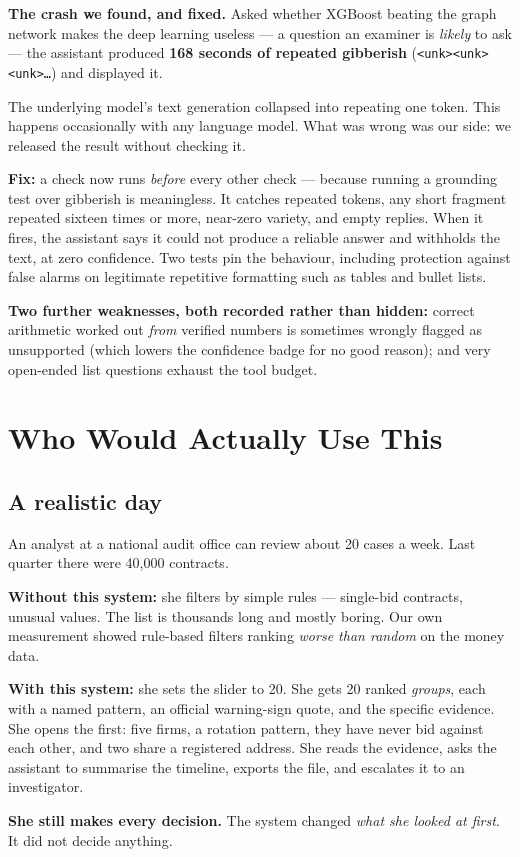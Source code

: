 \documentclass[11pt,a4paper]{article}
\newcommand{\code}[1]{\texttt{\small #1}}
\begin{document}
\begin{warnbox}
\textbf{The crash we found, and fixed.} Asked whether XGBoost beating the graph
network makes the deep learning useless --- a question an examiner is
\emph{likely} to ask --- the assistant produced \textbf{168 seconds of repeated
gibberish} (\code{<unk><unk><unk>\ldots}) and displayed it.

The underlying model's text generation collapsed into repeating one token. This
happens occasionally with any language model. What was wrong was our side: we
released the result without checking it.

\textbf{Fix:} a check now runs \emph{before} every other check --- because
running a grounding test over gibberish is meaningless. It catches repeated
tokens, any short fragment repeated sixteen times or more, near-zero variety,
and empty replies. When it fires, the assistant says it could not produce a
reliable answer and withholds the text, at zero confidence. Two tests pin the
behaviour, including protection against false alarms on legitimate repetitive
formatting such as tables and bullet lists.
\end{warnbox}

\textbf{Two further weaknesses, both recorded rather than hidden:} correct
arithmetic worked out \emph{from} verified numbers is sometimes wrongly flagged
as unsupported (which lowers the confidence badge for no good reason); and very
open-ended list questions exhaust the tool budget.

\section{Who Would Actually Use This}

\subsection{A realistic day}

\begin{plain}
An analyst at a national audit office can review about 20 cases a week. Last
quarter there were 40{,}000 contracts.

\textbf{Without this system:} she filters by simple rules --- single-bid contracts,
unusual values. The list is thousands long and mostly boring. Our own measurement
showed rule-based filters ranking \emph{worse than random} on the money data.

\textbf{With this system:} she sets the slider to 20. She gets 20 ranked
\emph{groups}, each with a named pattern, an official warning-sign quote, and the
specific evidence. She opens the first: five firms, a rotation pattern, they have
never bid against each other, and two share a registered address. She reads the
evidence, asks the assistant to summarise the timeline, exports the file, and
escalates it to an investigator.

\textbf{She still makes every decision.} The system changed \emph{what she looked
at first}. It did not decide anything.
\end{plain}
\end{document}
